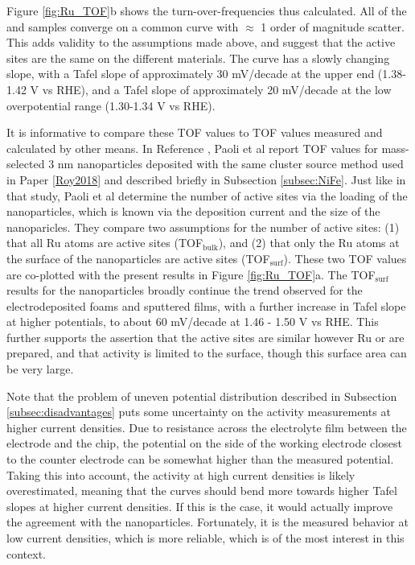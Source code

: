 Figure \ref{fig:Ru_TOF}b shows the turn-over-frequencies thus calculated. All of the  and  samples converge on a common curve with $\approx$ 1 order of magnitude scatter. This adds validity to the assumptions made above, and suggest that the active sites are the same on the different materials. The curve has a slowly changing slope, with a Tafel slope of approximately 30 mV/decade at the upper end (1.38-1.42 V vs RHE), and a Tafel slope of approximately 20 mV/decade at the low overpotential range (1.30-1.34 V vs RHE). 

It is informative to compare these TOF values to TOF values measured and calculated by other means. In Reference , Paoli et al report TOF values for mass-selected 3 nm  nanoparticles deposited with the same cluster source method used in Paper \ref{Roy2018} and described briefly in Subsection \ref{subsec:NiFe}. Just like in that study, Paoli et al determine the number of active sites via the loading of the nanoparticles, which is known via the deposition current and the size of the nanoparicles. They compare two assumptions for the number of active sites: (1) that all Ru atoms are active sites (TOF$_{\text{bulk}}$), and (2) that only the Ru atoms at the surface of the  nanoparticles are active sites  (TOF$_{\text{surf}}$). These two TOF values are co-plotted with the present results in Figure \ref{fig:Ru_TOF}a. The TOF$_{\text{surf}}$ results for the nanoparticles broadly continue the trend observed for the electrodeposited foams and sputtered films, with a further increase in Tafel slope at higher potentials, to about 60 mV/decade at 1.46 - 1.50 V vs RHE. This further supports the assertion that the active sites are similar however Ru or  are prepared, and that activity is limited to the surface, though this surface area can be very large.

Note that the problem of uneven potential distribution described in Subsection \ref{subsec:disadvantages} puts some uncertainty on the activity measurements at higher current densities. Due to resistance across the electrolyte film between the electrode and the chip, the potential on the side of the working electrode closest to the counter electrode can be somewhat higher than the measured potential. Taking this into account, the activity at high current densities is likely overestimated, meaning that the curves should bend more towards higher Tafel slopes at higher current densities. If this is the case, it would actually improve the agreement with the nanoparticles. Fortunately, it is the measured behavior at low current densities, which is more reliable, which is of the most interest in this context.

